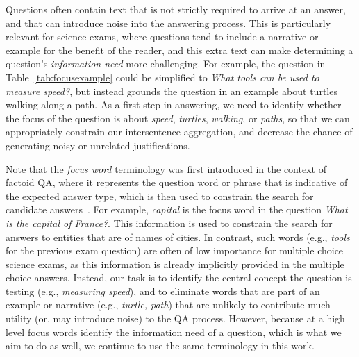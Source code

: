 Questions often contain text that is not strictly required to arrive at an answer, and that can introduce noise into the answering process. 
This is particularly relevant for science exams, where questions tend to include a narrative or example for the benefit of the reader, and this extra text can make determining a question's \emph{information need} more challenging. 
%
For example, the question in Table~\ref{tab:focusexample} could be simplified to {\em What tools can be used to measure speed?}, but instead grounds the question in an example about turtles walking along a path.  As a first step in answering, we need to identify whether the focus of the question is about {\em speed}, {\em turtles}, {\em walking}, or {\em paths}, so that we can appropriately constrain our intersentence aggregation, and decrease the chance of generating noisy or unrelated justifications. 

Note that the {\em focus word} terminology was first introduced in the context of factoid QA, where it represents the question word or phrase that is indicative of the expected answer type, which is then used to constrain the search for candidate answers~\cite{Harabagiu:00,Moldovan:2003:PIE:763693.763694}. For example, {\em capital} is the focus word in the question {\em What is the capital of France?}. This information is used to constrain the search for answers to  entities that are of names of cities. 
In contrast, such words (e.g., {\em tools} for the previous exam question) are often of low importance for multiple choice science exams, as this information is already implicitly provided in the multiple choice answers.  Instead, our task is to identify the central concept the question is testing (e.g., {\em  measuring speed}), and to eliminate words that are part of an example or narrative (e.g., {\em  turtle, path}) that are unlikely to contribute much utility (or, may introduce noise) to the QA process. However, because at a high level focus words identify the information need of a question, which is what we aim to do as well, we continue to use the same terminology in this work.


